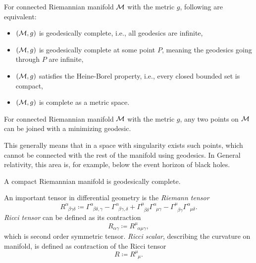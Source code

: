 \begin{thm}\emph{\citet[page 125]{petersen}}
    \label{thm:hopf-Rinow}


    For connected Riemannian manifold $\mathcal{M}$ with the metric $g$, following are equivalent:
    \begin{itemize}
        \item $(\mathcal{M},g)$ is geodesically complete, i.e., all geodesics are infinite,
        \item $(\mathcal{M},g)$ is geodesically complete at some point $P$, meaning the geodesics going through $P$ are infinite,
        \item $(\mathcal{M},g)$ satisfies the Heine-Borel property, i.e., every closed bounded set is compact,
        \item $(\mathcal{M},g)$ is complete as a metric space.
    \end{itemize}
\end{thm}
\begin{thm}\emph{\citet[Chapter 3]{claudio}}
    \label{thm:hopf-Rinow_modified}

    For connected Riemannian manifold $\mathcal{M}$ with the metric $g$, any two points on $\mathcal{M}$ can be joined with a minimizing geodesic.
\end{thm}
This generally means that in a space with singularity exists such points, which cannot be connected with the rest of the manifold using geodesics. In General relativity, this area is, for example, below the event horizon of black holes.

\begin{thm}[On completeness]\emph{\citet[Chapter 3]{claudio}}
    \label{thm:compact}
    
    A compact Riemannian manifold is geodesically complete.
\end{thm}





An important tensor in differential geometry is the \emph{Riemann tensor}
\begin{equation}
    R^\alpha_{\;\;\beta\gamma\delta}\coloneqq \Gamma^\alpha_{\;\;\beta\delta,\gamma}-\Gamma^\alpha_{\;\;\beta\gamma,\delta}+\Gamma^\mu_{\;\;\beta\delta}\Gamma^\alpha_{\;\;\mu\gamma}-\Gamma^\mu_{\;\;\beta\gamma}\Gamma^\alpha_{\;\;\mu\delta}.
\end{equation}
\emph{Ricci tensor} can be defined as its contraction 
\begin{equation}
    R_{\alpha\gamma}\coloneqq R^\mu_{\;\;\alpha\mu\gamma},
\end{equation}
which is second order symmetric tensor.
\emph{Ricci scalar}, describing the curvature on manifold, is defined as contraction of the Ricci tensor
\begin{equation}
    R\coloneqq R^\mu_{\;\;\mu}.
\end{equation}


